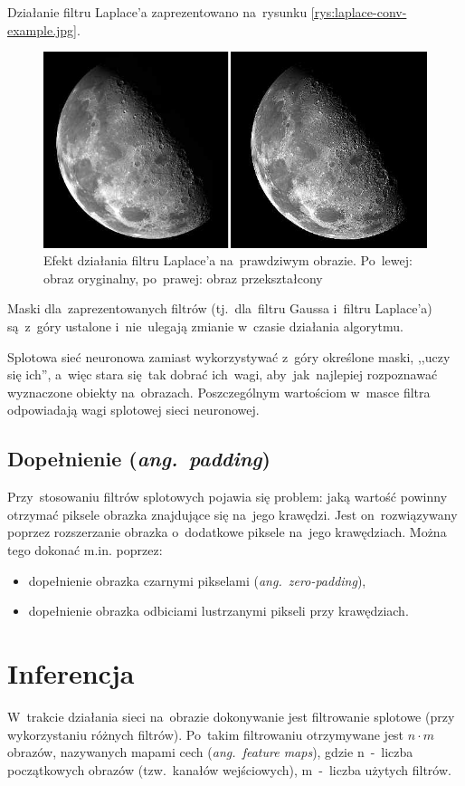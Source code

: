Działanie filtru Laplace'a zaprezentowano na~rysunku \ref{rys:laplace-conv-example.jpg}.

\begin{figure}[H]
	\centering
	\includegraphics[width=\linewidth]{img/laplace-conv-example.png}
	\caption{Efekt działania filtru Laplace'a na~prawdziwym obrazie. Po~lewej: obraz oryginalny, po~prawej: obraz
	przekształcony}
	\label{rys:laplace-conv-example}
\end{figure}

Maski dla~zaprezentowanych filtrów (tj.~dla~filtru Gaussa i~filtru Laplace'a) są~z~góry ustalone i~nie~ulegają zmianie
w~czasie działania algorytmu.

Splotowa sieć neuronowa zamiast wykorzystywać z~góry określone maski, ,,uczy się ich'',
a~więc stara się~tak dobrać ich~wagi, aby~jak~najlepiej rozpoznawać wyznaczone obiekty na~obrazach. Poszczególnym
wartościom w~masce filtra odpowiadają wagi splotowej sieci neuronowej.

\subsection{Dopełnienie (\textit{ang.~padding})}
Przy~stosowaniu filtrów splotowych pojawia się problem: jaką wartość powinny otrzymać piksele obrazka
znajdujące się na~jego krawędzi. Jest on~rozwiązywany poprzez rozszerzanie obrazka o~dodatkowe piksele
na~jego krawędziach. Można tego dokonać m.in. poprzez:
\begin{itemize}
  \item dopełnienie obrazka czarnymi pikselami (\textit{ang.~zero-padding}),
  \item dopełnienie obrazka odbiciami lustrzanymi pikseli przy krawędziach.
\end{itemize}

\section{Inferencja} \label{sec:inferencja}
W~trakcie działania sieci na~obrazie dokonywanie jest filtrowanie splotowe (przy wykorzystaniu różnych
filtrów). Po~takim filtrowaniu otrzymywane jest $n\cdot m$ obrazów, nazywanych mapami cech
(\textit{ang.~feature maps}), gdzie n~-~liczba początkowych obrazów (tzw.~kanałów wejściowych), m~-~liczba
użytych filtrów.

